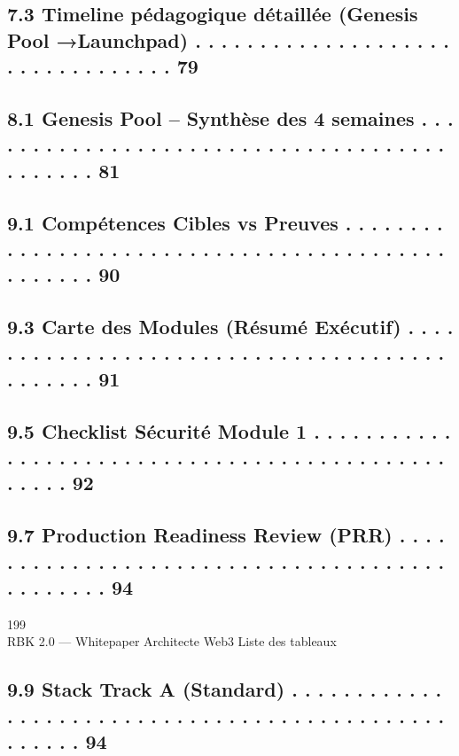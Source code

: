 \documentclass[12pt,landscape,a4paper]{article}
\begin{document}
\subsection{7.3 Timeline pédagogique détaillée (Genesis Pool →Launchpad) . . . . . . . . . . . . . . . . . . . . . . . . . . . . . . . . .          79}
\vspace{0.5em}
\subsection{8.1 Genesis Pool – Synthèse des 4 semaines . . . . . . . . . . . . . . . . . . . . . . . . . . . . . . . . . . . . . . . . . . . .      81}
\vspace{0.5em}
\subsection{9.1   Compétences Cibles vs Preuves . . . . . . . . . . . . . . . . . . . . . . . . . . . . . . . . . . . . . . . . . . . . . . . . .   90}
\subsection{9.3   Carte des Modules (Résumé Exécutif) . . . . . . . . . . . . . . . . . . . . . . . . . . . . . . . . . . . . . . . . . . . . .     91}
\subsection{9.5   Checklist Sécurité Module 1 . . . . . . . . . . . . . . . . . . . . . . . . . . . . . . . . . . . . . . . . . . . . . . . . . .   92}
\subsection{9.7   Production Readiness Review (PRR) . . . . . . . . . . . . . . . . . . . . . . . . . . . . . . . . . . . . . . . . . . . . . .     94}
\vspace{0.5em}
\vspace{0.5em}
\vspace{0.5em}
199\\
RBK 2.0 — Whitepaper Architecte Web3                                                                                          Liste des tableaux\\
\vspace{0.5em}
\vspace{0.5em}
\subsection{9.9 Stack Track A (Standard) . . . . . . . . . . . . . . . . . . . . . . . . . . . . . . . . . . . . . . . . . . . . . . . . . . . .      94}
\end{document}
